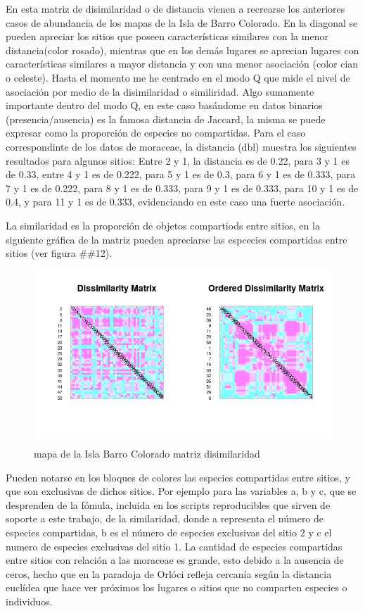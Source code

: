 \documentclass[11pt,]{article}
\begin{document}
En esta matriz de disimilaridad o de distancia vienen a recrearse los
anteriores casos de abundancia de los mapas de la Isla de Barro
Colorado. En la diagonal se pueden apreciar los sitios que poseen
características similares con la menor distancia(color rosado), mientras
que en los demás lugares se aprecian lugares con características
similares a mayor distancia y con una menor asociación (color cian o
celeste). Hasta el momento me he centrado en el modo Q que mide el nivel
de asociación por medio de la disimilaridad o similiridad. Algo
sumamente importante dentro del modo Q, en este caso basándome en datos
binarios (presencia/ausencia) es la famosa distancia de Jaccard, la
misma se puede expresar como la proporción de especies no compartidas.
Para el caso correspondinte de los datos de moraceae, la distancia (dbl)
muestra los siguientes resultados para algunos sitios: Entre 2 y 1, la
distancia es de 0.22, para 3 y 1 es de 0.33, entre 4 y 1 es de 0.222,
para 5 y 1 es de 0.3, para 6 y 1 es de 0.333, para 7 y 1 es de 0.222,
para 8 y 1 es de 0.333, para 9 y 1 es de 0.333, para 10 y 1 es de 0.4, y
para 11 y 1 es de 0.333, evidenciando en este caso una fuerte
asociación.

La similaridad es la proporción de objetos compartiods entre sitios, en
la siguiente gráfica de la matriz pueden apreciarse las espcecies
compartidas entre sitios (ver figura \#\#12).

\begin{figure}
\centering
\includegraphics[width=1.00000\textwidth]{matriz_similaridad.png}
\caption{mapa de la Isla Barro Colorado matriz disimilaridad
\label{fig:bci_map}}
\end{figure}

Pueden notarse en los bloques de colores las especies compartidas entre
sitios, y que son exclusivas de dichos sitios. Por ejemplo para las
variables a, b y c, que se desprenden de la fómula, incluida en los
scripts reproducibles que sirven de soporte a este trabajo, de la
similaridad, donde a representa el número de especies compartidas, b es
el número de especies exclusivas del sitio 2 y c el numero de especies
exclusivas del sitio 1. La cantidad de especies compartidas entre sitios
con relación a las moraceae es grande, esto debido a la ausencia de
ceros, hecho que en la paradoja de Orlóci refleja cercanía según la
distancia euclídea que hace ver próximos los lugares o sitios que no
comparten especies o individuos.
\end{document}
